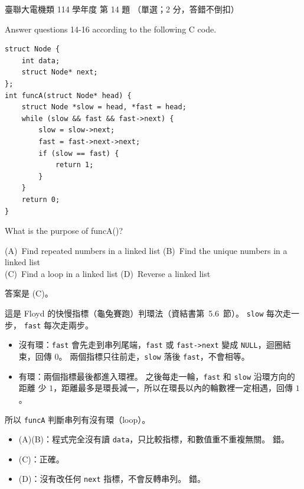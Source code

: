 \begin{pastexam}[label={px:ust-114-ee-ds-14}]{臺聯大電機類 114 學年度 第 14 題}
（單選；2 分，答錯不倒扣）

Answer questions 14-16 according to the following C code.
\begin{verbatim}
struct Node {
    int data;
    struct Node* next;
};
int funcA(struct Node* head) {
    struct Node *slow = head, *fast = head;
    while (slow && fast && fast->next) {
        slow = slow->next;
        fast = fast->next->next;
        if (slow == fast) {
            return 1;
        }
    }
    return 0;
}
\end{verbatim}

What is the purpose of funcA()?

(A)~Find repeated numbers in a linked list \qquad (B)~Find the unique numbers in a linked list\\
(C)~Find a loop in a linked list \qquad (D)~Reverse a linked list
\end{pastexam}

\begin{pastsoln}
答案是 (C)。

這是 Floyd 的快慢指標（龜兔賽跑）判環法（資結書第~5.6~節）。 \texttt{slow} 每次走一步，
\texttt{fast} 每次走兩步。
\begin{itemize}
\item 沒有環：\texttt{fast} 會先走到串列尾端，\texttt{fast} 或 \texttt{fast->next} 變成
\texttt{NULL}，迴圈結束，回傳 $0$。 兩個指標只往前走，\texttt{slow} 落後 \texttt{fast}，不會相等。
\item 有環：兩個指標最後都進入環裡。 之後每走一輪，\texttt{fast} 和 \texttt{slow} 沿環方向的距離
少 $1$，距離最多是環長減一，所以在環長以內的輪數裡一定相遇，回傳 $1$。
\end{itemize}
所以 \texttt{funcA} 判斷串列有沒有環（loop）。
\begin{itemize}
\item (A)(B)：程式完全沒有讀 \texttt{data}，只比較指標，和數值重不重複無關。 錯。
\item (C)：正確。
\item (D)：沒有改任何 \texttt{next} 指標，不會反轉串列。 錯。
\end{itemize}
\end{pastsoln}
